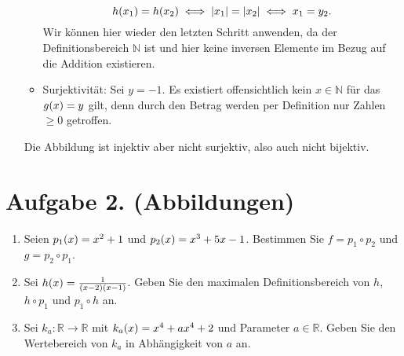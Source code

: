 \documentclass[german,12pt]{homework}
\newcommand{\NN}{\mathbb{N}}
\newcommand{\RR}{\mathbb{R}}
\DeclarePairedDelimiter{\absolute}{\lvert}{\rvert}
\DeclarePairedDelimiter{\enbrace}{(}{)}
\begin{document}
\begin{enumerate}
\begin{itemize}
            \[h\enbrace*{x_1} = h\enbrace*{x_2} \iff \absolute*{x_1} =
            \absolute*{x_2} \iff x_1 = y_2.\]
            Wir können hier wieder den letzten Schritt anwenden, da der
            Definitionsbereich \(\NN\) ist und hier keine inversen Elemente im
            Bezug auf die Addition existieren.
            \item Surjektivität: Sei \(y = -1\). Es existiert offensichtlich
            kein \(x \in \NN\) für das \(g\enbrace*{x} = y\) gilt, denn durch
            den Betrag werden per Definition nur Zahlen \(\ge 0\) getroffen.
        \end{itemize}
        Die Abbildung ist injektiv aber nicht surjektiv, also auch nicht
        bijektiv.
    \end{enumerate}

    \section*{Aufgabe 2. (Abbildungen)}

    \begin{problem}
        \begin{enumerate}
            \item Seien \(p_1\enbrace*{x} = x^2 + 1\) und \(p_2\enbrace*{x} =
            x^3 + 5x - 1\). Bestimmen Sie \(f = p_1 \circ p_2\) und \(g = p_2
            \circ p_1\).
            \item Sei \(h\enbrace*{x} = \frac{1}{\enbrace*{x - 2}\enbrace*{x -
            1}}\). Geben Sie den maximalen Definitionsbereich von \(h\), \(h
            \circ p_1\) und \(p_1 \circ h\) an.
            \item Sei \(k_a: \RR \to \RR\) mit \(k_a\enbrace*{x} = x^4 + ax^4 +
            2\) und Parameter \(a \in \RR\). Geben Sie den Wertebereich von
            \(k_a\) in Abhängigkeit von \(a\) an.
        \end{enumerate}
    \end{problem}
\end{document}
